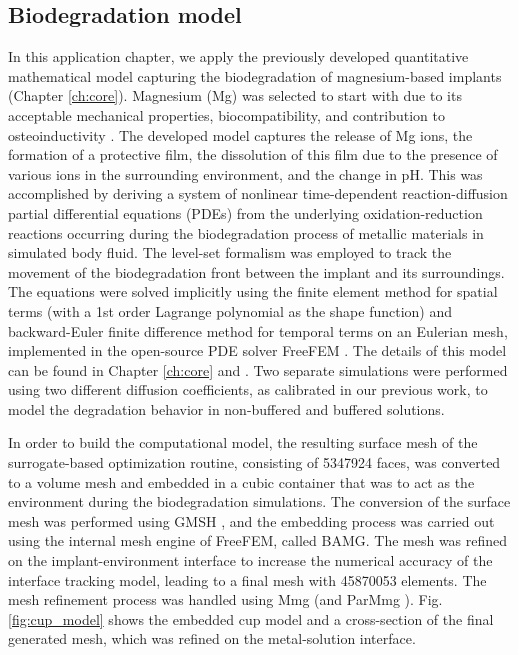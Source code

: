 \subsection{Biodegradation model}

In this application chapter, we apply the previously developed quantitative mathematical model capturing the biodegradation of magnesium-based implants (Chapter \ref{ch:core}). Magnesium (Mg) was selected to start with due to its acceptable mechanical properties, biocompatibility, and contribution to osteoinductivity \cite{Agarwal2016}. The developed model captures the release of Mg ions, the formation of a protective film,  the dissolution of this film due to the presence of various ions in the surrounding environment, and the change in pH. This was accomplished by deriving a system of nonlinear time-dependent reaction-diffusion partial differential equations ({PDE}s) from the underlying oxidation-reduction reactions occurring during the biodegradation process of metallic materials in simulated body fluid. The level-set formalism was employed to track the movement of the biodegradation front between the implant and its surroundings. The equations were solved implicitly using the finite element method for spatial terms (with a 1st order Lagrange polynomial as the shape function) and backward-Euler finite difference method for temporal terms on an Eulerian mesh, implemented in the open-source {PDE} solver FreeFEM \cite{Hecht2012}. The details of this model can be found in Chapter \ref{ch:core} and  \cite{Barzegari2021}. Two separate simulations were performed using two different diffusion coefficients, as calibrated in our previous work, to model the degradation behavior in non-buffered and buffered solutions.

In order to build the computational model, the resulting surface mesh of the surrogate-based optimization routine, consisting of \num{5347924} faces, was converted to a volume mesh and embedded in a cubic container that was to act as the environment during the biodegradation simulations. The conversion of the surface mesh was performed using GMSH \cite{Geuzaine2009}, and the embedding process was carried out using the internal mesh engine of FreeFEM, called BAMG. The mesh was refined on the implant-environment interface to increase the numerical accuracy of the interface tracking model, leading to a final mesh with \num{45870053} elements. The mesh refinement process was handled using Mmg \cite{Dapogny2014} (and ParMmg \cite{balarac:hal-03344779}). Fig. \ref{fig:cup_model} shows the embedded cup model and a cross-section of the final generated mesh, which was refined on the metal-solution interface.



